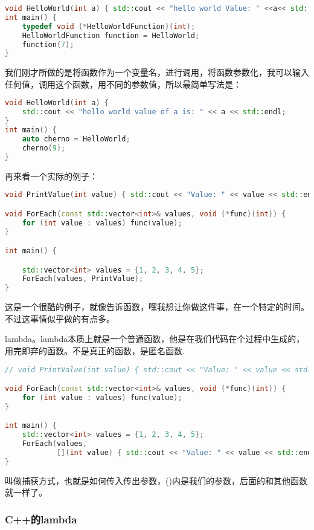\begin{lstlisting}[language=c++]
void HelloWorld(int a) { std::cout << "hello world Value: " <<a<< std::endl; }
int main() {
    typedef void (*HelloWorldFunction)(int);
    HelloWorldFunction function = HelloWorld;
    function(7);
}
\end{lstlisting}

我们刚才所做的是将函数作为一个变量名，进行调用，将函数参数化，我可以输入任何值，调用这个函数，用不同的参数值，所以最简单写法是：

\begin{lstlisting}[language=c++]
void HelloWorld(int a) {
    std::cout << "hello world value of a is: " << a << std::endl;
}
int main() {
    auto cherno = HelloWorld;
    cherno(9);
}
\end{lstlisting}

再来看一个实际的例子：

\begin{lstlisting}[language=c++]
void PrintValue(int value) { std::cout << "Value: " << value << std::endl; }

void ForEach(const std::vector<int>& values, void (*func)(int)) {
    for (int value : values) func(value);
}

int main() {

    std::vector<int> values = {1, 2, 3, 4, 5};
    ForEach(values, PrintValue);
}
\end{lstlisting}

这是一个很酷的例子，就像告诉函数，嘿我想让你做这件事，在一个特定的时间。不过这事情似乎做的有点多。

lambda。lambda本质上就是一个普通函数，他是在我们代码在个过程中生成的，用完即弃的函数。不是真正的函数，是匿名函数.

\begin{lstlisting}[language=c++]
// void PrintValue(int value) { std::cout << "Value: " << value << std::endl; }

void ForEach(const std::vector<int>& values, void (*func)(int)) {
    for (int value : values) func(value);
}

int main() {
    std::vector<int> values = {1, 2, 3, 4, 5};
    ForEach(values,
            [](int value) { std::cout << "Value: " << value << std::endl; });
}
\end{lstlisting}

{\ncodestyle []}叫做捕获方式，也就是如何传入传出参数，{\ncodestyle ()}内是我们的参数，后面的和其他函数就一样了。

\subsubsection{C++的lambda}


